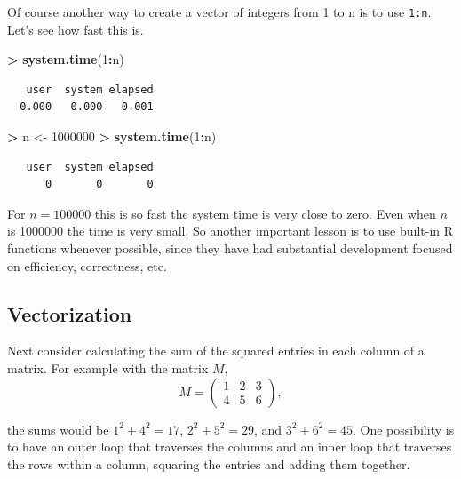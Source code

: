 \documentclass[]{krantz}
\makeatletter
\newenvironment{Shaded}{\begin{snugshade}}{\end{snugshade}}
\newcommand{\DecValTok}[1]{\textcolor[rgb]{0.06,0.06,0.06}{#1}}
\newcommand{\KeywordTok}[1]{\textcolor[rgb]{0.27,0.27,0.27}{\textbf{#1}}}
\newcommand{\NormalTok}[1]{#1}
\newcommand{\OperatorTok}[1]{\textcolor[rgb]{0.43,0.43,0.43}{\textbf{#1}}}
\newcommand{\StringTok}[1]{\textcolor[rgb]{0.5,0.5,0.5}{#1}}
\newenvironment{kframe}{%
\medskip{}
\setlength{\fboxsep}{.8em}
 \def\at@end@of@kframe{}%
 \ifinner\ifhmode%
  \def\at@end@of@kframe{\end{minipage}}%
  \begin{minipage}{\columnwidth}%
 \fi\fi%
 \def\FrameCommand##1{\hskip\@totalleftmargin \hskip-\fboxsep
 \colorbox{shadecolor}{##1}\hskip-\fboxsep
     \hskip-\linewidth \hskip-\@totalleftmargin \hskip\columnwidth}%
 \MakeFramed {\advance\hsize-\width
   \@totalleftmargin\z@ \linewidth\hsize
   \@setminipage}}%
 {\par\unskip\endMakeFramed%
 \at@end@of@kframe}
\renewenvironment{Shaded}{\begin{kframe}}{\end{kframe}}
\makeatother
\begin{document}
Of course another way to create a vector of integers from 1 to n is to use \texttt{1:n}. Let's see how fast this is.

\begin{Shaded}
\begin{Highlighting}[]
\OperatorTok{>}\StringTok{ }\KeywordTok{system.time}\NormalTok{(}\DecValTok{1}\OperatorTok{:}\NormalTok{n)}
\end{Highlighting}
\end{Shaded}

\begin{verbatim}
   user  system elapsed 
  0.000   0.000   0.001 
\end{verbatim}

\begin{Shaded}
\begin{Highlighting}[]
\OperatorTok{>}\StringTok{ }\NormalTok{n <-}\StringTok{ }\DecValTok{1000000}
\OperatorTok{>}\StringTok{ }\KeywordTok{system.time}\NormalTok{(}\DecValTok{1}\OperatorTok{:}\NormalTok{n)}
\end{Highlighting}
\end{Shaded}

\begin{verbatim}
   user  system elapsed 
      0       0       0 
\end{verbatim}

For \(n=100000\) this is so fast the system time is very close to zero. Even when \(n\) is 1000000 the time is very small. So another important lesson is to use built-in R functions whenever possible, since they have had substantial development focused on efficiency, correctness, etc.

\hypertarget{vectorization}{%
\subsection{Vectorization}\label{vectorization}}

Next consider calculating the sum of the squared entries in each column of a matrix. For example with the matrix \(M\),
\[
M = \left(\begin{array}{ccc}
1 & 2 & 3 \\
4 & 5 & 6
\end{array}\right),
\]

the sums would be \(1^2 + 4^2 = 17\), \(2^2 + 5^2 = 29\), and \(3^2 + 6^2 = 45\).
One possibility is to have an outer loop that traverses the columns and an inner loop that traverses the rows within a column, squaring the entries and adding them together.
\end{document}
